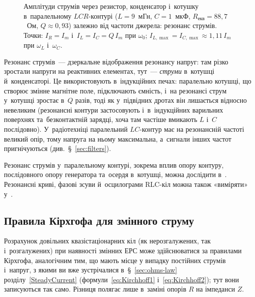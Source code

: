 \begin{figure}[h!]
	\centering
	\caption{Амплітуди струмів через резистор, конденсатор і~котушку в~паралельному $LCR$-контурі ($L = 9$~мГн, $C = 1$~мкФ, $R_{\text{екв}} = 88{,}7$~Ом, $Q \approx 0{,}93$) залежно від частоти джерела: резонанс струмів. Точки: $I_R = I_m$ і~$I_L = I_C = Q\,I_m$ при $\omega_0$; $I_{L,\max} = I_{C,\max} \approx 1{,}11\,I_m$ при $\omega_L$ і~$\omega_C$.}
	\label{tikz:parallel_resonance}
\end{figure}

Резонанс струмів~--- дзеркальне відображення резонансу напруг: там різко зростали напруги на реактивних елементах, тут~--- \emph{струми} в~котушці й~конденсаторі. Це використовують в~індукційних печах: паралельно котушці, що створює змінне магнітне поле, підключають ємність, і~на резонансі струм у~котушці зростає в~$Q$ разів, тоді як у~підвідних дротах він лишається відносно невеликим (резонансні контури застосовують і~в~індукційних варильних поверхнях та~безконтактній зарядці, хоча там частіше вмикають $L$ і~$C$ послідовно). У~радіотехніці паралельний $LC$-контур має на резонансній частоті великий опір, тому напруга на ньому максимальна, а~сигнали інших частот пригнічуються (див.~\S~\ref{sec:filters}).

\begin{Simulation}
Резонанс струмів у~паралельному контурі, зокрема вплив опору контуру, послідовного опору генератора та~осердя в~котушці, можна дослідити в~. Резонансні криві, фазові зсуви й~осцилограми RLC-кіл можна також «виміряти» у~.
\end{Simulation}


\subsection*{Правила Кірхгофа для змінного струму}

Розрахунок довільних квазістаціонарних кіл (як нерозгалужених, так і~розгалужених) при наявності змінних ЕРС може здійснюватися за правилами Кірхгофа, аналогічним тим, що мають місце у
випадку постійних струмів і~напруг, з якими ви вже зустрічалися в~§~\ref{sec:ohms-law} розділу~\ref{SteadyCurrent} (формули~\eqref{eq:Kirchhoff1} і~\eqref{eq:Kirchhoff2}); тут вони записуються так само. Різниця полягає лише в~заміні
опорів $R$ на імпеданси $Z$.

